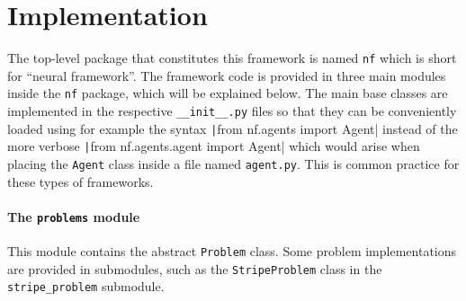 \section{Implementation}
The top-level package that constitutes this framework is named \texttt{nf} which is short for ``neural framework''.
The framework code is provided in three main modules inside the \texttt{nf} package, which will be explained below.
The main base classes are implemented in the respective \texttt{\_\_init\_\_.py} files so that they can be conveniently loaded using for example the syntax
\texttt|from nf.agents import Agent|
instead of the more verbose
\texttt|from nf.agents.agent import Agent|
which would arise when placing the \texttt{Agent} class inside a file named \texttt{agent.py}.
This is common practice for these types of frameworks.

\paragraph{The \texttt{problems} module}
This module contains the abstract \texttt{Problem} class. 
Some problem implementations are provided in submodules, such as the \texttt{StripeProblem} class in the \texttt{stripe\_problem} submodule.

